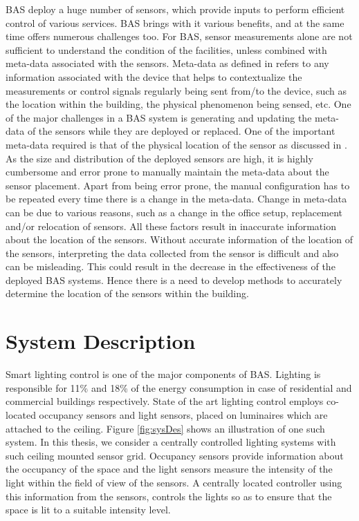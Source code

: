 BAS deploy a huge number of sensors, which provide inputs to perform efficient control of various services. BAS brings with it various benefits, and at the same time offers numerous challenges too. For BAS, sensor measurements alone are not sufficient to understand the condition of the facilities, unless combined with meta-data associated with the sensors.
Meta-data as defined in \cite{gao2015data} refers to any information associated  with the device that helps to contextualize the measurements or control signals regularly being sent from/to the device, such as the location within the building, the physical phenomenon being sensed, etc. One of the major challenges in a BAS system is generating and updating the meta-data of the sensors while they are deployed or replaced.
One of the important meta-data required is that of the physical location of the sensor as discussed in \cite{liu2009requirements}.
As the size and distribution of the deployed sensors are high, it is highly cumbersome and error prone to manually maintain the meta-data about the sensor placement. Apart from being error prone, the manual configuration has to be repeated every time there is a change in the meta-data. Change in meta-data can be due to various reasons, such as a change in the office setup, replacement and/or relocation of sensors. All these factors result in inaccurate information about the location of the sensors. Without accurate information of the location of the sensors, interpreting the data collected from the sensor is difficult and also can be misleading. This could result in the decrease in the effectiveness of the deployed BAS systems. Hence there is a need to develop methods to accurately determine the location of the sensors within the building.
\section{System Description}
Smart lighting control is one of the major components of BAS. Lighting is responsible for 11\%  and 18\% of the energy consumption in case of residential and commercial buildings respectively\cite{website}. 
State of the art lighting control employs co-located occupancy sensors and light sensors, placed on luminaires which are attached to the ceiling\cite{pandharipande2015smart,caicedo2016smart,van2014distributed}. Figure \ref{fig:sysDes} shows an illustration of one such system. In this thesis, we consider a centrally controlled lighting systems with such ceiling mounted sensor grid. Occupancy sensors provide information about the occupancy of the space and the light sensors measure the intensity of the light within the field of view of the sensors. A centrally located controller using this information from the sensors, controls the lights so as to ensure that the space is lit to a suitable intensity level.

